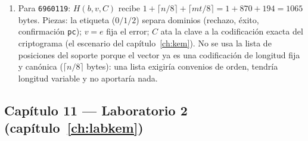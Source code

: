 \documentclass[11pt,a4paper,oneside]{report}
\begin{document}
\begin{enumerate}[leftmargin=1.9em,itemsep=4pt]
        esa asimetría es justo la que quiere un KEM: el lado sin
        clave (cifrar) por el camino barato y paralelo, y el lado
        con la clave (descifrar) pagando el álgebra fuerte.
  \item Para \texttt{6960119}: $H(b,v,C)$ recibe $1+\lceil
        n/8\rceil+\lceil mt/8\rceil=1+870+194=1065$ bytes. Piezas:
        la etiqueta ($0/1/2$) separa dominios (rechazo, éxito,
        confirmación \texttt{pc}); $v=e$ fija el error; $C$ ata la
        clave a la codificación exacta del criptograma (el escenario
        del capítulo~\ref{ch:kem}). No se usa la lista de posiciones
        del soporte porque el vector ya es una codificación de
        longitud fija y canónica ($\lceil n/8\rceil$ bytes): una
        lista exigiría convenios de orden, tendría longitud variable
        y no aportaría nada.
\end{enumerate}

\subsection*{Capítulo 11 --- Laboratorio 2
(capítulo~\ref{ch:labkem})}
\end{document}
